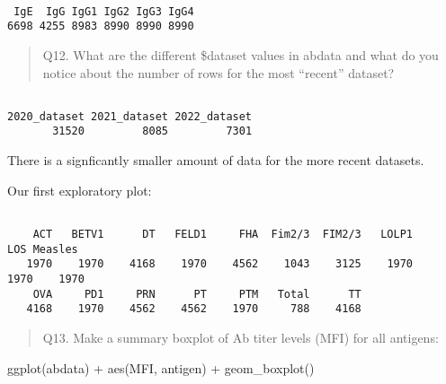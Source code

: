 \documentclass[
  letterpaper,
  DIV=11,
  numbers=noendperiod]{scrartcl}
\newenvironment{Shaded}{\begin{snugshade}}{\end{snugshade}}
\newcommand{\FunctionTok}[1]{\textcolor[rgb]{0.28,0.35,0.67}{#1}}
\newcommand{\NormalTok}[1]{\textcolor[rgb]{0.00,0.23,0.31}{#1}}
\newcommand{\SpecialCharTok}[1]{\textcolor[rgb]{0.37,0.37,0.37}{#1}}
\begin{document}
\begin{verbatim}

 IgE  IgG IgG1 IgG2 IgG3 IgG4 
6698 4255 8983 8990 8990 8990 
\end{verbatim}

\begin{quote}
Q12. What are the different \$dataset values in abdata and what do you
notice about the number of rows for the most ``recent'' dataset?
\end{quote}

\begin{Shaded}
\end{Shaded}

\begin{verbatim}

2020_dataset 2021_dataset 2022_dataset 
       31520         8085         7301 
\end{verbatim}

There is a signficantly smaller amount of data for the more recent
datasets.

Our first exploratory plot:

\begin{Shaded}
\end{Shaded}

\begin{verbatim}

    ACT   BETV1      DT   FELD1     FHA  Fim2/3  FIM2/3   LOLP1     LOS Measles 
   1970    1970    4168    1970    4562    1043    3125    1970    1970    1970 
    OVA     PD1     PRN      PT     PTM   Total      TT 
   4168    1970    4562    4562    1970     788    4168 
\end{verbatim}

\begin{quote}
Q13. Make a summary boxplot of Ab titer levels (MFI) for all antigens:
\end{quote}

\begin{Shaded}
\begin{Highlighting}[]
\FunctionTok{ggplot}\NormalTok{(abdata) }\SpecialCharTok{+}
  \FunctionTok{aes}\NormalTok{(MFI, antigen) }\SpecialCharTok{+}
  \FunctionTok{geom\_boxplot}\NormalTok{()}
\end{Highlighting}
\end{Shaded}
\end{document}
